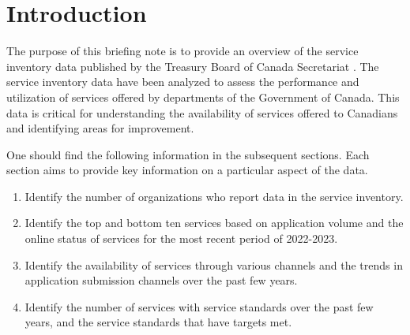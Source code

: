 \section{Introduction}

The purpose of this briefing note is to provide an overview of the service inventory
data published by the Treasury Board of Canada Secretariat \cite{cite1}. The service
inventory data have been analyzed to assess the performance and utilization of services
offered by departments of the Government of Canada. This data is critical for
understanding the availability of services offered to Canadians and identifying areas
for improvement.

One should find the following information in the subsequent sections. Each section aims
to provide key information on a particular aspect of the data.
\begin{tcolorbox}[title=Key Findings,boxrule=1pt]
    \begin{enumerate}
        \item Identify the number of organizations who report data in the service inventory.

        \item Identify the top and bottom ten services based on application volume and the online status of services for the most recent period of 2022-2023.

        \item Identify the availability of services through various channels and the trends in application submission channels over the past few years.

        \item Identify the number of services with service standards over the past few years, and the service standards that have targets met.
    \end{enumerate}
\end{tcolorbox}